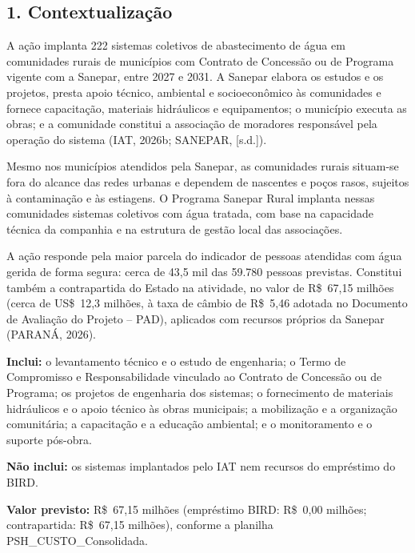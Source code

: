
{}
\subsection*{1. Contextualização}

A ação implanta 222 sistemas coletivos de abastecimento de água em comunidades rurais de municípios com Contrato de Concessão ou de Programa vigente com a Sanepar, entre 2027 e 2031. A Sanepar elabora os estudos e os projetos, presta apoio técnico, ambiental e socioeconômico às comunidades e fornece capacitação, materiais hidráulicos e equipamentos; o município executa as obras; e a comunidade constitui a associação de moradores responsável pela operação do sistema (IAT, 2026b; SANEPAR, [s.d.]).

Mesmo nos municípios atendidos pela Sanepar, as comunidades rurais situam-se fora do alcance das redes urbanas e dependem de nascentes e poços rasos, sujeitos à contaminação e às estiagens. O Programa Sanepar Rural implanta nessas comunidades sistemas coletivos com água tratada, com base na capacidade técnica da companhia e na estrutura de gestão local das associações.

A ação responde pela maior parcela do indicador de pessoas atendidas com água gerida de forma segura: cerca de 43,5 mil das 59.780 pessoas previstas. Constitui também a contrapartida do Estado na atividade, no valor de R\$~67,15 milhões (cerca de US\$~12,3 milhões, à taxa de câmbio de R\$~5,46 adotada no Documento de Avaliação do Projeto – PAD), aplicados com recursos próprios da Sanepar (PARANÁ, 2026).

\textbf{Inclui:} o levantamento técnico e o estudo de engenharia; o Termo de Compromisso e Responsabilidade vinculado ao Contrato de Concessão ou de Programa; os projetos de engenharia dos sistemas; o fornecimento de materiais hidráulicos e o apoio técnico às obras municipais; a mobilização e a organização comunitária; a capacitação e a educação ambiental; e o monitoramento e o suporte pós-obra.

\textbf{Não inclui:} os sistemas implantados pelo IAT nem recursos do empréstimo do BIRD.

\textbf{Valor previsto:} R\$~67,15 milhões (empréstimo BIRD: R\$~0,00 milhões; contrapartida: R\$~67,15 milhões), conforme a planilha PSH\_CUSTO\_Consolidada.

{}
